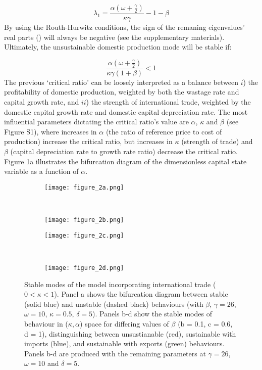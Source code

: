 \documentclass[12pt]{article}
\begin{document}
\begin{equation}
  \lambda_{1} = \frac{\alpha(\omega + \frac{\gamma}{2})}{\kappa \gamma} - 1 - \beta
\end{equation}
%
By using the Routh-Hurwitz conditions, the sign of the remaning eigenvalues' real parts (\cite{ottoday2011}) will always be negative (see the supplementary materials). Ultimately, the unsustainable domestic production mode will be stable if:

\begin{equation}
  \frac{ \alpha (\omega + \frac{\gamma}{2})}{\kappa \gamma(1+\beta)} < 1
\end{equation}
%
The previous `critical ratio' can be loosely interpreted as a balance between $i$) the profitability of domestic production, weighted by both the wastage rate and capital growth rate, and $ii$) the strength of international trade, weighted by the domestic capital growth rate and domestic capital depreciation rate. The most influential parameters dictating the critical ratio's value are $\alpha$, $\kappa$ and $\beta$ (see Figure S1), where increases in $\alpha$ (the ratio of reference price to cost of production) increase the critical ratio, but increases in $\kappa$ (strength of trade) and $\beta$ (capital depreciation rate to growth rate ratio) decrease the critical ratio. Figure 1a illustrates the bifurcation diagram of the dimensionless capital state variable as a function of $\alpha$.

\begin{figure}[t!]
  \begin{subfigure}{0.5\textwidth}
      \texttt{[image: figure\_2a.png]}
  \end{subfigure}%
  ~%
  \begin{subfigure}{0.5\textwidth}
      \texttt{[image: figure\_2b.png]}
  \end{subfigure}

  \begin{subfigure}{0.5\textwidth}
      \texttt{[image: figure\_2c.png]}
  \end{subfigure}%
  ~%
  \begin{subfigure}{0.5\textwidth}
      \texttt{[image: figure\_2d.png]}
  \end{subfigure}%

  \caption{Stable modes of the model incorporating international trade ($0 < \kappa < 1$). Panel a shows the bifurcation diagram between stable (solid blue) and unstable (dashed black) behaviours (with $\beta$, $\gamma = 26$, $\omega = 10$, $\kappa = 0.5$, $\delta = 5$). Panels b-d show the stable modes of behaviour in ($\kappa, \alpha$) space for differing values of $\beta$ (b = 0.1, c = 0.6, d = 1), distinguishing between unsustianable (red), sustainable with imports (blue), and sustainable with exports (green) behaviours. Panels b-d are produced with the remaining parameters at $\gamma = 26$, $\omega = 10$ and $\delta = 5$.}
  \label{figure2}
\end{figure}
\end{document}
